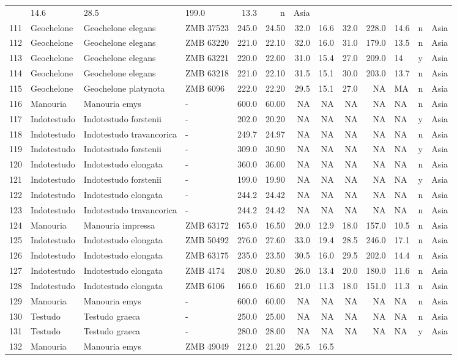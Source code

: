 \documentclass[]{article}
\begin{document}
\begin{longtable}[]{@{}llllrrrrrrlll@{}}
& 14.6 & 28.5 & 199.0 & 13.3 & n & Asia\tabularnewline
111 & Geochelone & Geochelone elegans & ZMB 37523 & 245.0 & 24.50 & 32.0
& 16.6 & 32.0 & 228.0 & 14.6 & n & Asia\tabularnewline
112 & Geochelone & Geochelone elegans & ZMB 63220 & 221.0 & 22.10 & 32.0
& 16.0 & 31.0 & 179.0 & 13.5 & n & Asia\tabularnewline
113 & Geochelone & Geochelone elegans & ZMB 63221 & 220.0 & 22.00 & 31.0
& 15.4 & 27.0 & 209.0 & 14 & y & Asia\tabularnewline
114 & Geochelone & Geochelone elegans & ZMB 63218 & 221.0 & 22.10 & 31.5
& 15.1 & 30.0 & 203.0 & 13.7 & n & Asia\tabularnewline
115 & Geochelone & Geochelone platynota & ZMB 6096 & 222.0 & 22.20 &
29.5 & 15.1 & 27.0 & NA & MA & n & Asia\tabularnewline
116 & Manouria & Manouria emys & - & 600.0 & 60.00 & NA & NA & NA & NA &
NA & n & Asia\tabularnewline
117 & Indotestudo & Indotestudo forstenii & - & 202.0 & 20.20 & NA & NA
& NA & NA & NA & y & Asia\tabularnewline
118 & Indotestudo & Indotestudo travancorica & - & 249.7 & 24.97 & NA &
NA & NA & NA & NA & n & Asia\tabularnewline
119 & Indotestudo & Indotestudo forstenii & - & 309.0 & 30.90 & NA & NA
& NA & NA & NA & y & Asia\tabularnewline
120 & Indotestudo & Indotestudo elongata & - & 360.0 & 36.00 & NA & NA &
NA & NA & NA & n & Asia\tabularnewline
121 & Indotestudo & Indotestudo forstenii & - & 199.0 & 19.90 & NA & NA
& NA & NA & NA & y & Asia\tabularnewline
122 & Indotestudo & Indotestudo elongata & - & 244.2 & 24.42 & NA & NA &
NA & NA & NA & n & Asia\tabularnewline
123 & Indotestudo & Indotestudo travancorica & - & 244.2 & 24.42 & NA &
NA & NA & NA & NA & n & Asia\tabularnewline
124 & Manouria & Manouria impressa & ZMB 63172 & 165.0 & 16.50 & 20.0 &
12.9 & 18.0 & 157.0 & 10.5 & n & Asia\tabularnewline
125 & Indotestudo & Indotestudo elongata & ZMB 50492 & 276.0 & 27.60 &
33.0 & 19.4 & 28.5 & 246.0 & 17.1 & n & Asia\tabularnewline
126 & Indotestudo & Indotestudo elongata & ZMB 63175 & 235.0 & 23.50 &
30.5 & 16.0 & 29.5 & 202.0 & 14.4 & n & Asia\tabularnewline
127 & Indotestudo & Indotestudo elongata & ZMB 4174 & 208.0 & 20.80 &
26.0 & 13.4 & 20.0 & 180.0 & 11.6 & n & Asia\tabularnewline
128 & Indotestudo & Indotestudo elongata & ZMB 6106 & 166.0 & 16.60 &
21.0 & 11.3 & 18.0 & 151.0 & 11.3 & n & Asia\tabularnewline
129 & Manouria & Manouria emys & - & 600.0 & 60.00 & NA & NA & NA & NA &
NA & n & Asia\tabularnewline
130 & Testudo & Testudo graeca & - & 250.0 & 25.00 & NA & NA & NA & NA &
NA & n & Asia\tabularnewline
131 & Testudo & Testudo graeca & - & 280.0 & 28.00 & NA & NA & NA & NA &
NA & y & Asia\tabularnewline
132 & Manouria & Manouria emys & ZMB 49049 & 212.0 & 21.20 & 26.5 & 16.5

\end{longtable}
\end{document}
